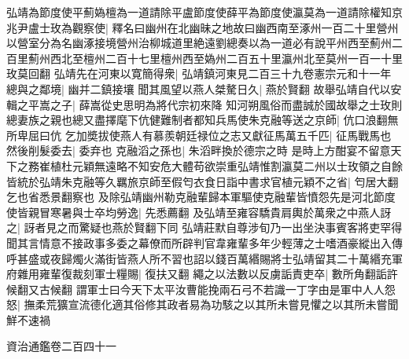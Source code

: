 弘靖為節度使平薊媯檀為一道請除平盧節度使薛平為節度使瀛莫為一道請除權知京兆尹盧士玫為觀察使|{
	釋名曰幽州在北幽昧之地故曰幽西南至涿州一百二十里營州以營室分為名幽涿接境營州治柳城道里絶遠劉總奏以為一道必有說平州西至薊州二百里薊州西北至檀州二百十七里檀州西至媯州二百五十里瀛州北至莫州一百一十里玫莫回翻}
弘靖先在河東以寛簡得衆|{
	弘靖鎮河東見二百三十九卷憲宗元和十一年}
總與之鄰境|{
	幽并二鎮接壤}
聞其風望以燕人桀驁日久|{
	燕於賢翻}
故舉弘靖自代以安輯之平嵩之子|{
	薛嵩從史思明為將代宗初來降}
知河朔風俗而盡誠於國故舉之士玫則總妻族之親也總又盡擇麾下伉健難制者都知兵馬使朱克融等送之京師|{
	伉口浪翻無所卑屈曰伉}
乞加奬拔使燕人有慕羨朝廷禄位之志又獻征馬萬五千匹|{
	征馬戰馬也}
然後削髮委去|{
	委弃也}
克融滔之孫也|{
	朱滔畔換於德宗之時}
是時上方酣宴不留意天下之務崔植杜元穎無遠略不知安危大體苟欲崇重弘靖惟割瀛莫二州以士玫領之自餘皆統於弘靖朱克融等久羈旅京師至假匄衣食日詣中書求官植元穎不之省|{
	匄居大翻乞也省悉景翻察也}
及除弘靖幽州勒克融輩歸本軍驅使克融輩皆憤怨先是河北節度使皆親冒寒暑與士卒均勞逸|{
	先悉薦翻}
及弘靖至雍容驕貴肩輿於萬衆之中燕人訝之|{
	訝者見之而驚疑也燕於賢翻下同}
弘靖莊默自尊涉旬乃一出坐決事賓客將吏罕得聞其言情意不接政事多委之幕僚而所辟判官韋雍輩多年少輕薄之士嗜酒豪縱出入傳呼甚盛或夜歸燭火滿街皆燕人所不習也詔以錢百萬緡賜將士弘靖留其二十萬緡充軍府雜用雍輩復裁刻軍士糧賜|{
	復扶又翻}
繩之以法數以反虜詬責吏卒|{
	數所角翻詬許候翻又古候翻}
謂軍士曰今天下太平汝曹能挽兩石弓不若識一丁字由是軍中人人怨怒|{
	撫柔荒獷宣流德化適其俗修其政者易為功駭之以其所未嘗見懼之以其所未嘗聞鮮不速禍}


資治通鑑卷二百四十一
